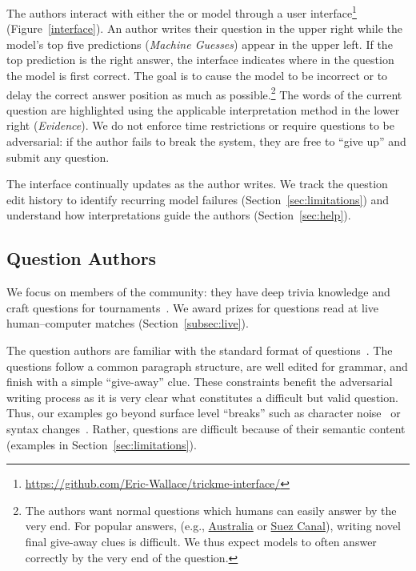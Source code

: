 The authors interact with either the  or  model through
a user interface\footnote{\url{https://github.com/Eric-Wallace/trickme-interface/}}
(Figure~\ref{interface}). An author writes their question in the upper
right while the model's top five predictions (\textit{Machine
  Guesses}) appear in the upper left. If the top prediction is the
right answer, the interface indicates where in the question
the model is first correct. The goal is to cause the model to
be incorrect or to delay the correct answer position as much as
possible.\footnote{The authors want normal \qb{} questions 
which humans can easily answer by the very end. For popular answers,
  (e.g., \underline{Australia} or \underline{Suez Canal}), writing novel
  final give-away clues is difficult. We thus expect models to often answer correctly
  by the very end of the question.} The words of the
current question are highlighted using the applicable interpretation
method in the lower right (\emph{Evidence}). We do not enforce
time restrictions or require questions to be adversarial: if the
author fails to break the system, they are free to ``give up'' and
submit any question.

The interface continually updates as the author writes.
We track the question edit history to identify recurring model
failures (Section~\ref{sec:limitations}) and understand how
interpretations guide the authors (Section~\ref{sec:help}).

\subsection{Question Authors}

We focus on members of the \qb{} community: they have deep trivia knowledge and craft
questions for \qb{} tournaments~\cite{jennings-06}. We award prizes for questions
read at live human--computer matches (Section~\ref{subsec:live}).

The question authors are familiar with the standard format of \qb{}
questions~\cite{lujan2003writing}. The questions follow a common
paragraph structure, are well edited for grammar, and finish with a
simple ``give-away'' clue. These constraints benefit the adversarial
writing process as it is very clear what constitutes a difficult but
valid question. Thus, our examples go beyond surface level ``breaks''
such as character noise~\cite{belinkov2018synthetic} or syntax
changes~\cite{iyyerscpn2018}. Rather, questions are difficult because
of their semantic content (examples in Section~\ref{sec:limitations}).

